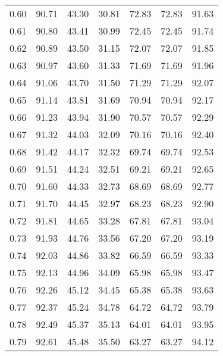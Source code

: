 \begin{tabular}{|c|c|c|c|c|c|c|}
      0.60 &     90.71 &     43.30 &      30.81 &   72.83 &      72.83 &         91.63 \\
      0.61 &     90.80 &     43.41 &      30.99 &   72.45 &      72.45 &         91.74 \\
      0.62 &     90.89 &     43.50 &      31.15 &   72.07 &      72.07 &         91.85 \\
      0.63 &     90.97 &     43.60 &      31.33 &   71.69 &      71.69 &         91.96 \\
      0.64 &     91.06 &     43.70 &      31.50 &   71.29 &      71.29 &         92.07 \\
      0.65 &     91.14 &     43.81 &      31.69 &   70.94 &      70.94 &         92.17 \\
      0.66 &     91.23 &     43.94 &      31.90 &   70.57 &      70.57 &         92.29 \\
      0.67 &     91.32 &     44.03 &      32.09 &   70.16 &      70.16 &         92.40 \\
      0.68 &     91.42 &     44.17 &      32.32 &   69.74 &      69.74 &         92.53 \\
      0.69 &     91.51 &     44.24 &      32.51 &   69.21 &      69.21 &         92.65 \\
      0.70 &     91.60 &     44.33 &      32.73 &   68.69 &      68.69 &         92.77 \\
      0.71 &     91.70 &     44.45 &      32.97 &   68.23 &      68.23 &         92.90 \\
      0.72 &     91.81 &     44.65 &      33.28 &   67.81 &      67.81 &         93.04 \\
      0.73 &     91.93 &     44.76 &      33.56 &   67.20 &      67.20 &         93.19 \\
      0.74 &     92.03 &     44.86 &      33.82 &   66.59 &      66.59 &         93.33 \\
      0.75 &     92.13 &     44.96 &      34.09 &   65.98 &      65.98 &         93.47 \\
      0.76 &     92.26 &     45.12 &      34.45 &   65.38 &      65.38 &         93.63 \\
      0.77 &     92.37 &     45.24 &      34.78 &   64.72 &      64.72 &         93.79 \\
      0.78 &     92.49 &     45.37 &      35.13 &   64.01 &      64.01 &         93.95 \\
      0.79 &     92.61 &     45.48 &      35.50 &   63.27 &      63.27 &         94.12 \\

\end{tabular}
